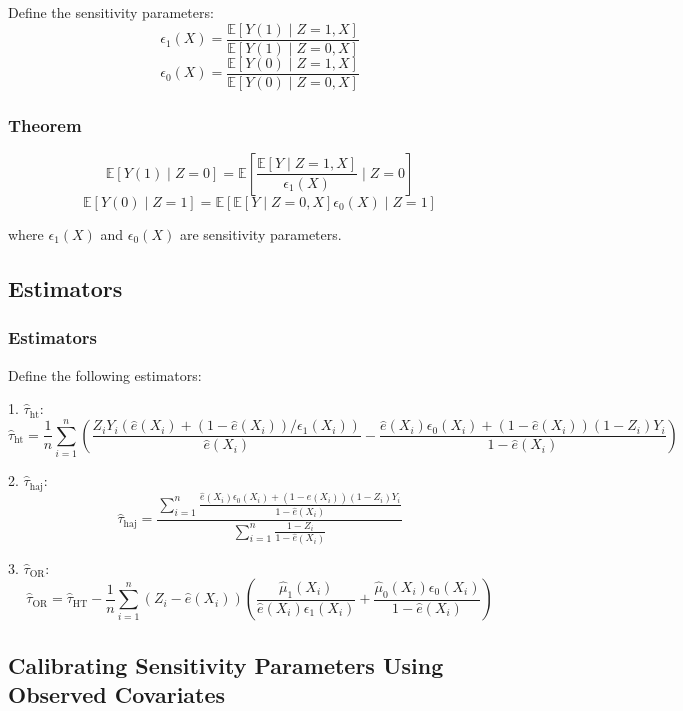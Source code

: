 Define the sensitivity parameters:
\[
\epsilon_1(X) = \frac{\mathbb{E}[Y(1) \mid Z=1, X]}{\mathbb{E}[Y(1) \mid Z=0, X]}
\]
\[
\epsilon_0(X) = \frac{\mathbb{E}[Y(0) \mid Z=1, X]}{\mathbb{E}[Y(0) \mid Z=0, X]}
\]

\subsubsection{Theorem}



\[
\mathbb{E}[Y(1) \mid Z=0] = \mathbb{E} \left[ \frac{\mathbb{E}[Y \mid Z=1, X]}{\epsilon_1(X)} \mid Z=0 \right]
\]
\[
\mathbb{E}[Y(0) \mid Z=1] = \mathbb{E} \left[ \mathbb{E}[Y \mid Z=0, X] \epsilon_0(X) \mid Z=1 \right]
\]

where \( \epsilon_1(X) \) and \( \epsilon_0(X) \) are sensitivity parameters.





\subsection{Estimators}


\subsubsection{Estimators}

Define the following estimators:

1. \(\hat{\tau}_{\text{ht}}\):
\[
\hat{\tau}_{\text{ht}} = \frac{1}{n} \sum_{i=1}^n \left( \frac{Z_i Y_i \left( \hat{e}(X_i) + (1 - \hat{e}(X_i)) / \epsilon_1(X_i) \right)}{\hat{e}(X_i)} - \frac{\hat{e}(X_i) \epsilon_0(X_i) + (1 - \hat{e}(X_i))(1 - Z_i) Y_i}{1 - \hat{e}(X_i)} \right)
\]


2. \(\hat{\tau}_{\text{haj}}\):
\[
\hat{\tau}_{\text{haj}} = \frac{\sum_{i=1}^n \frac{\hat{e}(X_i) \epsilon_0(X_i) + (1 - \hat{e}(X_i))(1 - Z_i) Y_i}{1 - \hat{e}(X_i)}}{\sum_{i=1}^n \frac{1 - Z_i}{1 - \hat{e}(X_i)}}
\]



3. \(\hat{\tau}_{\text{OR}}\):
\[
\hat{\tau}_{\text{OR}} = \hat{\tau}_{\text{HT}} - \frac{1}{n} \sum_{i=1}^n \left( Z_i - \hat{e}(X_i) \right) \left( \frac{\hat{\mu}_1(X_i)}{\hat{e}(X_i) \epsilon_1(X_i)} + \frac{\hat{\mu}_0(X_i) \epsilon_0(X_i)}{1 - \hat{e}(X_i)} \right)
\]



\subsection{Calibrating Sensitivity Parameters Using Observed Covariates}

